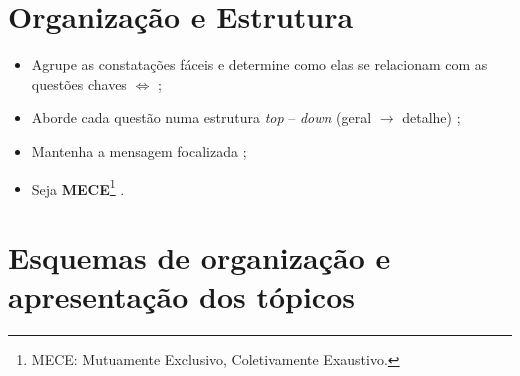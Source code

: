 \section{Organização e Estrutura}

\begin{itemize}
	\item  Agrupe as constatações fáceis e determine como elas se relacionam com as questões chaves \faObjectUngroup[regular]\;  $\Leftrightarrow$\; \faKey;
	\item  Aborde cada questão numa estrutura \emph{top} -- \emph{down} (geral $\to$ detalhe) \faSitemap;
	\item  Mantenha a mensagem focalizada \faMicroscope;
	\item  Seja \textbf{MECE}\footnote{MECE: Mutuamente
			Exclusivo, Coletivamente Exaustivo.} \faBuromobelexperte.
\end{itemize}

\section{Esquemas de organização e apresentação dos tópicos}


